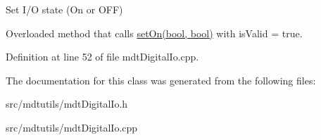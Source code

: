 Set I/O state (On or OFF) 

Overloaded method that calls \hyperlink{classmdt_digital_io_ae43db36b2d9f2c3d38cdd97e2ea84bda}{setOn(bool, bool)} with isValid = true. 

Definition at line 52 of file mdtDigitalIo.cpp.



The documentation for this class was generated from the following files:\begin{DoxyCompactItemize}
\item 
src/mdtutils/mdtDigitalIo.h\item 
src/mdtutils/mdtDigitalIo.cpp\end{DoxyCompactItemize}
